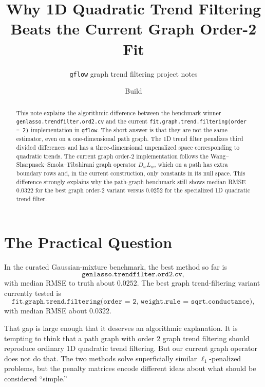 \documentclass[11pt]{article}
\title{Why 1D Quadratic Trend Filtering Beats the Current Graph Order-2 Fit}
\author{\texttt{gflow} graph trend filtering project notes}
\date{Build \reportbuilddatetime}
\begin{document}
\maketitle

\begin{abstract}
This note explains the algorithmic difference between the benchmark winner
\texttt{genlasso.trendfilter.ord2.cv} and the current
\texttt{fit.graph.trend.filtering(order = 2)} implementation in
\texttt{gflow}.  The short answer is that they are not the same estimator, even
on a one-dimensional path graph.  The 1D trend filter penalizes third divided
differences and has a three-dimensional unpenalized space corresponding to
quadratic trends.  The current graph order-2 implementation follows the
Wang--Sharpnack--Smola--Tibshirani graph operator \(D_wL_w\), which on a path
has extra boundary rows and, in the current construction, only constants in its
null space.  This difference strongly explains why the path-graph benchmark
still shows median RMSE \(0.0322\) for the best graph order-2 variant versus
\(0.0252\) for the specialized 1D quadratic trend filter.
\end{abstract}

\section{The Practical Question}

In the curated Gaussian-mixture benchmark, the best method so far is
\[
  \texttt{genlasso.trendfilter.ord2.cv},
\]
with median RMSE to truth about \(0.0252\).  The best graph trend-filtering
variant currently tested is
\[
  \texttt{fit.graph.trend.filtering(order = 2,\ weight.rule = sqrt.conductance)},
\]
with median RMSE about \(0.0322\).

That gap is large enough that it deserves an algorithmic explanation.  It is
tempting to think that a path graph with order \(2\) graph trend filtering
should reproduce ordinary 1D quadratic trend filtering.  But our current graph
operator does not do that.  The two methods solve superficially similar
\(\ell_1\)-penalized problems, but the penalty matrices encode different
ideas about what should be considered ``simple.''
\end{document}

